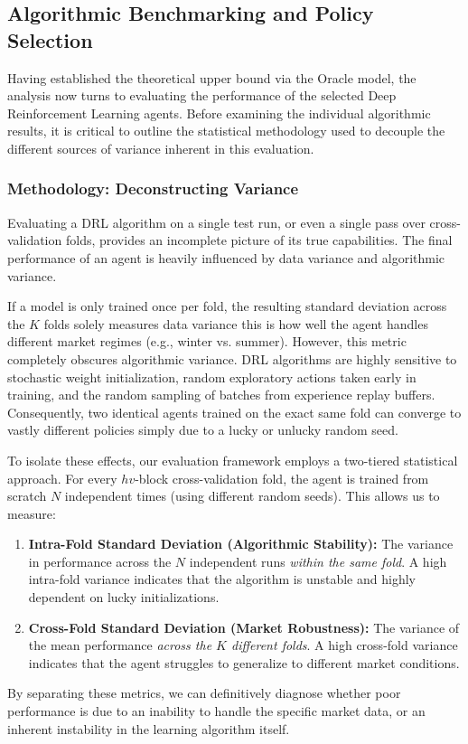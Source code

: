        \subsection{Algorithmic Benchmarking and Policy Selection}
            
            Having established the theoretical upper bound via the Oracle model, the analysis now turns to evaluating the performance of the selected Deep Reinforcement Learning agents. Before examining the individual algorithmic results, it is critical to outline the statistical methodology used to decouple the different sources of variance inherent in this evaluation.
            
            \subsubsection{Methodology: Deconstructing Variance}
            
            Evaluating a DRL algorithm on a single test run, or even a single pass over cross-validation folds, provides an incomplete picture of its true capabilities. The final performance of an agent is heavily influenced by data variance and algorithmic variance.
            
            If a model is only trained once per fold, the resulting standard deviation across the $K$ folds solely measures data variance this is how well the agent handles different market regimes (e.g., winter vs. summer). However, this metric completely obscures algorithmic variance. DRL algorithms are highly sensitive to stochastic weight initialization, random exploratory actions taken early in training, and the random sampling of batches from experience replay buffers. Consequently, two identical agents trained on the exact same fold can converge to vastly different policies simply due to a lucky or unlucky random seed.
            
            To isolate these effects, our evaluation framework employs a two-tiered statistical approach. For every $hv$-block cross-validation fold, the agent is trained from scratch $N$ independent times (using different random seeds). This allows us to measure:
            \begin{enumerate}
                \item \textbf{Intra-Fold Standard Deviation (Algorithmic Stability):} The variance in performance across the $N$ independent runs \textit{within the same fold}. A high intra-fold variance indicates that the algorithm is unstable and highly dependent on lucky initializations.
                \item \textbf{Cross-Fold Standard Deviation (Market Robustness):} The variance of the mean performance \textit{across the $K$ different folds}. A high cross-fold variance indicates that the agent struggles to generalize to different market conditions.
            \end{enumerate}
            By separating these metrics, we can definitively diagnose whether poor performance is due to an inability to handle the specific market data, or an inherent instability in the learning algorithm itself.
            
